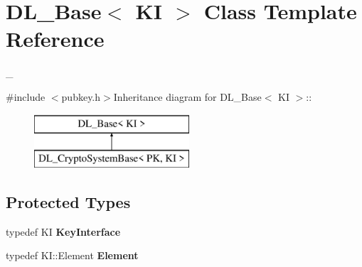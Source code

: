\hypertarget{class_d_l___base}{
\section{DL\_\-Base$<$ KI $>$ Class Template Reference}
\label{class_d_l___base}
}


\_\-  


{\ttfamily \#include $<$pubkey.h$>$}Inheritance diagram for DL\_\-Base$<$ KI $>$::\begin{figure}[H]
\begin{center}
\leavevmode
\includegraphics[height=2cm]{class_d_l___base}
\end{center}
\end{figure}
\subsection*{Protected Types}
\begin{DoxyCompactItemize}
\item 
\hypertarget{class_d_l___base_afd4bfa675133a35fe8e2f5b43d0d58cf}{
typedef KI {\bfseries KeyInterface}}
\label{class_d_l___base_afd4bfa675133a35fe8e2f5b43d0d58cf}

\item 
\hypertarget{class_d_l___base_a262cca9b2150f88c5bbad144b6f98bdf}{
typedef KI::Element {\bfseries Element}}
\label{class_d_l___base_a262cca9b2150f88c5bbad144b6f98bdf}

\end{DoxyCompactItemize}
